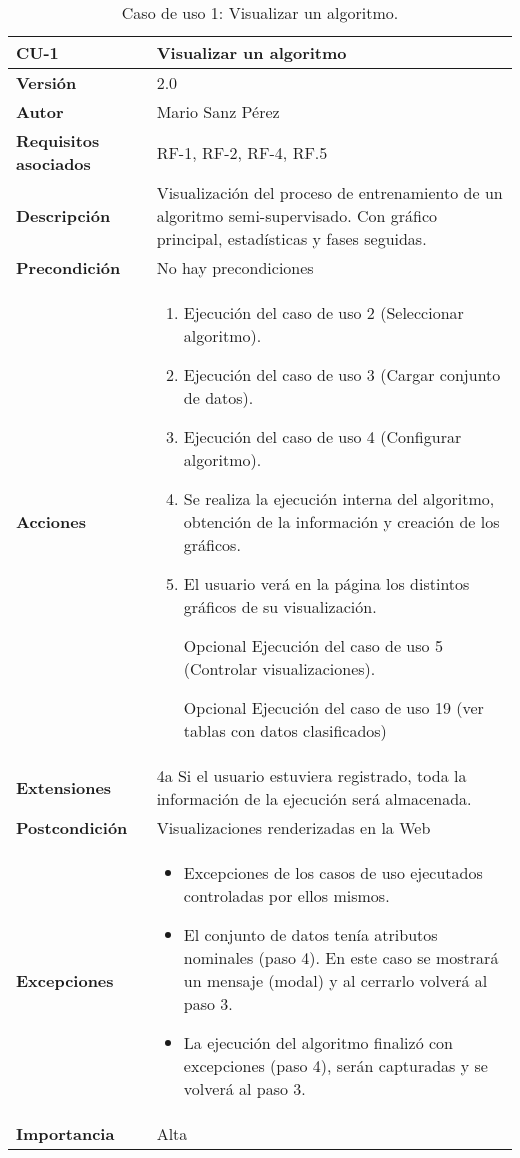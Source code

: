 \begin{table}[p]
	\centering
	\begin{tabularx}{\linewidth}{ p{} p{} }
		\toprule
		\textbf{CU-1}    & \textbf{Visualizar un algoritmo}\\
		\toprule
		\textbf{Versión}              & 2.0    \\
		\textbf{Autor}                & Mario Sanz Pérez \\
		\textbf{Requisitos asociados} & RF-1, RF-2, RF-4, RF.5 \\
		\textbf{Descripción}          & Visualización del proceso de entrenamiento de un algoritmo semi-supervisado. Con gráfico principal, estadísticas y fases seguidas. \\
		\textbf{Precondición}         & No hay precondiciones \\
		\textbf{Acciones}             &
		\begin{enumerate}
			\def\labelenumi{\arabic{enumi}.}
			\tightlist
			\item Ejecución del caso de uso 2 (Seleccionar algoritmo).
			\item Ejecución del caso de uso 3 (Cargar conjunto de datos).
			\item Ejecución del caso de uso 4 (Configurar algoritmo).
			\item Se realiza la ejecución interna del algoritmo, obtención de la información y creación de los gráficos.
			\item El usuario verá en la página los distintos gráficos de su visualización. 
			\item [Opcional] Ejecución del caso de uso 5 (Controlar visualizaciones).
			\item [Opcional] Ejecución del caso de uso 19 (ver tablas con datos clasificados)
 		\end{enumerate}\\
		\textbf{Extensiones}          & 4a Si el usuario estuviera registrado, toda la información de la ejecución será almacenada. \\
		\textbf{Postcondición}        & Visualizaciones renderizadas en la Web \\
		\textbf{Excepciones}          & \begin{itemize}
			\item Excepciones de los casos de uso ejecutados controladas por ellos mismos.
			\item El conjunto de datos tenía atributos nominales (paso 4). En este caso se mostrará un mensaje (modal) y al cerrarlo volverá al paso 3.
			\item La ejecución del algoritmo finalizó con excepciones (paso 4), serán capturadas y se volverá al paso 3.
		\end{itemize}	 \\
		\textbf{Importancia}          & Alta\\
		\bottomrule
	\end{tabularx}
	\caption{Caso de uso 1: Visualizar un algoritmo.}
\end{table}

